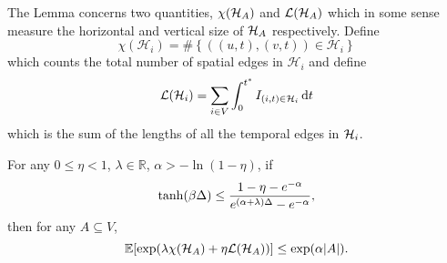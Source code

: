 	The Lemma concerns two quantities, $\chi(\mathcal{H}_A)$ and $\mathcal{L}(\mathcal{H}_A)$ which in some sense measure the horizontal and vertical size of $\mathcal{H}_A$ respectively. 
	Define
	\begin{equation}
		\chi(\mathcal{H}_i) = \#\left\{ \left( (u,t), (v,t) \right) \in \mathcal{H}_i \right\}
	\end{equation}
	which counts the total number of spatial edges in $\mathcal{H}_i$ and define
	\begin{equation}
		\mathcal{L}(\mathcal{H}_i) = \sum_{i \in V} \int_{0}^{t^*} I_{(i, t) \in \mathcal{H}_i} \, \mathrm{d} t
	\end{equation}
	which is the sum of the lengths of all the temporal edges in $\mathcal{H}_i$. 

	\begin{lemma}
		\label{lem:full submartingale thing}
		For any $0 \leq \eta < 1$, $\lambda \in \mathbb{R}$, $\alpha > -\ln(1 - \eta)$, if
		\begin{equation}
			\tanh(\beta\Delta) \leq \frac{1 - \eta - e^{-\alpha}}{e^{(\alpha+\lambda)\Delta} - e^{-\alpha}},
		\end{equation}
		then for any $A \subseteq V$,
		\begin{equation}
			\mathbb{E}[\exp(\lambda \chi(\mathcal{H}_A) + \eta \mathcal{L}(\mathcal{H}_A))] \leq \exp(\alpha |A|).
		\end{equation}
	\end{lemma}

